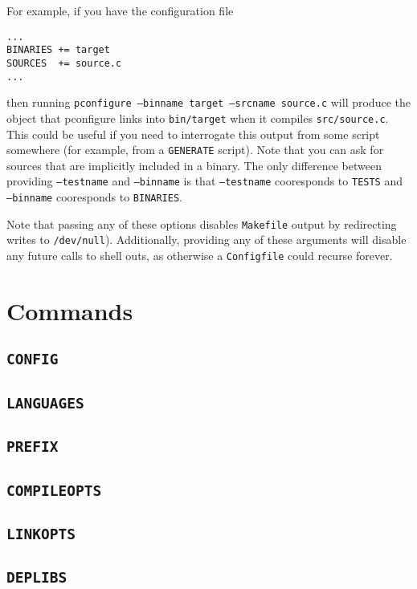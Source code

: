 \documentclass{article}
\begin{document}
For example, if you have the configuration file
\begin{verbatim}
...
BINARIES += target
SOURCES  += source.c
...
\end{verbatim}
then running \texttt{pconfigure --binname target --srcname source.c}
will produce the object that pconfigure links into \texttt{bin/target}
when it compiles \texttt{src/source.c}.  This could be useful if you
need to interrogate this output from some script somewhere (for
example, from a \texttt{GENERATE} script).  Note that you can ask for
sources that are implicitly included in a binary.  The only difference
between providing \texttt{--testname} and \texttt{--binname} is that
\texttt{--testname} cooresponds to \texttt{TESTS} and
\texttt{--binname} cooresponds to \texttt{BINARIES}.

Note that passing any of these options disables \texttt{Makefile}
output by redirecting writes to \texttt{/dev/null}).  Additionally,
providing any of these arguments will disable any future calls to
shell outs, as otherwise a \texttt{Configfile} could recurse forever.

\section{Commands \label{cmd}}

\subsection{\texttt{CONFIG} \label{cmd:config}}

\subsection{\texttt{LANGUAGES}}

\subsection{\texttt{PREFIX}}

\subsection{\texttt{COMPILEOPTS}}

\subsection{\texttt{LINKOPTS}}

\subsection{\texttt{DEPLIBS}}
\end{document}
